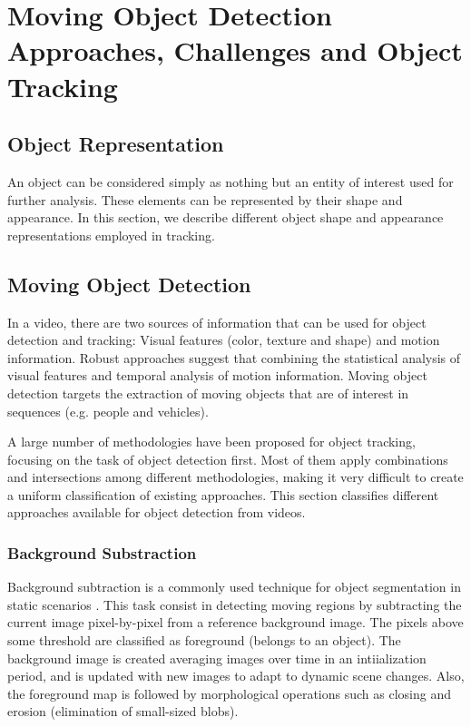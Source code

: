 
\chapter{Moving Object Detection Approaches, Challenges and Object Tracking} %

\label{chapter2} %


\section{Object Representation}

An object can be considered simply as nothing but an entity of interest used for further analysis. These elements can be represented by their shape and appearance. In this section, we describe different object shape and appearance representations employed in tracking.

\section{Moving Object Detection}

In a video, there are two sources of information that can be used for object detection and tracking: Visual features (color, texture and shape) and motion information. Robust approaches suggest that combining the statistical analysis of visual features and temporal analysis of motion information. Moving object detection targets the extraction of moving objects that are of interest in sequences (e.g. people and vehicles).

A large number of methodologies have been proposed for object tracking, focusing on the task of object detection first. Most of them  apply combinations and intersections among different methodologies, making it very difficult to create a uniform classification of existing approaches. This section classifies different approaches available for object detection from videos.

\subsection{Background Substraction}

Background subtraction is a commonly used technique for object segmentation in static scenarios \cite{McIvor2000}. This task consist in detecting moving regions by subtracting the current image pixel-by-pixel from a reference background image. The pixels above some threshold are classified as foreground (belongs to an object). The background image is created averaging images over time in an intiialization period, and is updated with new images to adapt to dynamic scene changes. Also, the foreground map is followed by morphological operations such as closing and erosion (elimination of small-sized blobs).

